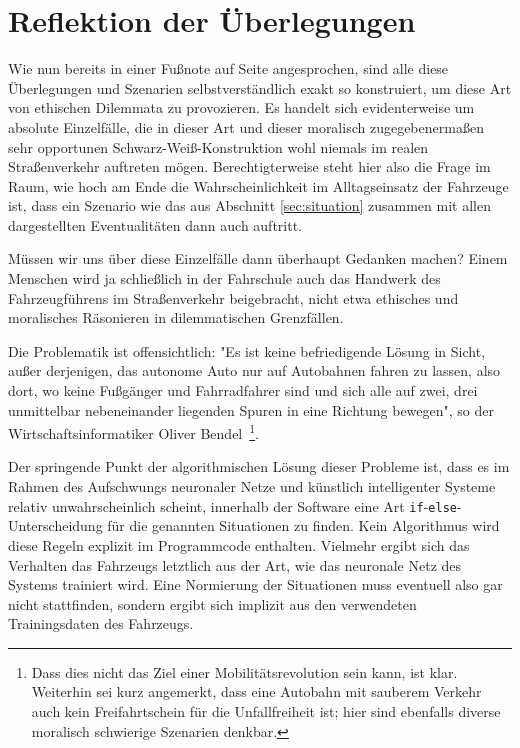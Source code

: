 \documentclass[twocolumn, german]{tum-article}
\begin{document}
\section{Reflektion der Überlegungen}
\label{sec:reflect}
Wie nun bereits in einer Fußnote auf Seite \pageref{fn:constructed} angesprochen, sind alle diese Überlegungen und Szenarien selbstverständlich exakt so konstruiert, um diese Art von ethischen Dilemmata zu provozieren.
Es handelt sich evidenterweise um absolute Einzelfälle, die in dieser Art und dieser moralisch zugegebenermaßen sehr opportunen Schwarz-Weiß-Konstruktion wohl niemals im realen Straßenverkehr auftreten mögen.
Berechtigterweise steht hier also die Frage im Raum, wie hoch am Ende die Wahrscheinlichkeit im Alltagseinsatz der Fahrzeuge ist, dass ein Szenario wie das aus Abschnitt \ref{sec:situation} zusammen mit allen dargestellten Eventualitäten dann auch auftritt.

Müssen wir uns über diese Einzelfälle dann überhaupt Gedanken machen?
Einem Menschen wird ja schließlich in der Fahrschule auch das Handwerk des Fahrzeugführens im Straßenverkehr beigebracht, nicht etwa ethisches und moralisches Räsonieren in dilemmatischen Grenzfällen.

Die Problematik ist offensichtlich:
"Es ist keine befriedigende Lösung in Sicht, außer derjenigen, das autonome Auto nur auf Autobahnen fahren zu lassen, also dort, wo keine Fußgänger und Fahrradfahrer sind und sich alle auf zwei, drei unmittelbar nebeneinander liegenden Spuren in eine Richtung bewegen", so der Wirtschaftsinformatiker Oliver Bendel~\cite[S. 29]{bendel-mascheth}\footnote{Dass dies nicht das Ziel einer Mobilitätsrevolution sein kann, ist klar. Weiterhin sei kurz angemerkt, dass eine Autobahn mit sauberem Verkehr auch kein Freifahrtschein für die Unfallfreiheit ist; hier sind ebenfalls diverse moralisch schwierige Szenarien denkbar.}.

Der springende Punkt der algorithmischen Lösung dieser Probleme ist, dass es im Rahmen des Aufschwungs neuronaler Netze und künstlich intelligenter Systeme relativ unwahrscheinlich scheint, innerhalb der Software eine Art \verb!if!-\verb!else!-Unterscheidung für die genannten Situationen zu finden.
Kein Algorithmus wird diese Regeln explizit im Programmcode enthalten.
Vielmehr ergibt sich das Verhalten das Fahrzeugs letztlich aus der Art, wie das neuronale Netz des Systems trainiert wird.
Eine Normierung der Situationen muss eventuell also gar nicht stattfinden, sondern ergibt sich implizit aus den verwendeten Trainingsdaten des Fahrzeugs.
\end{document}

